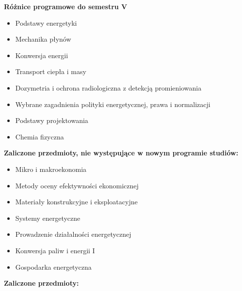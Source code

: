 \documentclass[a4paper,12pt]{article}
\begin{document}
\textbf{Różnice programowe do semestru V}
\begin{itemize}
\item Podstawy energetyki
\item Mechanika płynów
\item Konwersja energii
\item Transport ciepła i masy
\item Dozymetria i ochrona radiologiczna z detekcją promieniowania
\item Wybrane zagadnienia polityki energetycznej, prawa i normalizacji
\item Podstawy projektowania
\item Chemia fizyczna
\end{itemize}
\vspace{20pt}
\textbf{Zaliczone przedmioty, nie występujące w nowym programie studiów:}
\begin{itemize}
\item Mikro i makroekonomia
\item Metody oceny efektywności ekonomicznej
\item Materiały konstrukcyjne i eksploatacyjne
\item Systemy energetyczne
\item Prowadzenie działalności energetycznej
\item Konwersja paliw i energii I
\item Gospodarka energetyczna
\end{itemize}
\newpage
\textbf{Zaliczone przedmioty:}
\end{document}
